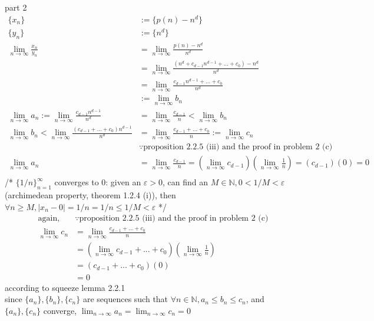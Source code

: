 \documentclass[12pt, border = 4pt, multi]{article} %
\begin{document}
part 2
\begin{align*}
\{x_n\} &:= \{p(n) - n ^ d\}\\
\{y_n\} &:= \{n ^ d\}\\
\lim_{n \rightarrow \infty} \frac{x_n}{y_n} &= \lim_{n \rightarrow \infty} \frac{p(n) - n ^ d}{n ^ d}\\
&= \lim_{n \rightarrow \infty} \frac{(n ^ d + c_{d - 1} n ^ {d - 1} + ... + c_0) - n ^ d}{n ^ d}\\
&= \lim_{n \rightarrow \infty} \frac{c_{d - 1} n ^ {d - 1} + ... + c_0}{n ^ d}\\
&:= \lim_{n \rightarrow \infty} b_n\\
\lim_{n \rightarrow \infty} a_n := \lim_{n \rightarrow \infty} \frac{c_{d - 1} n ^ {d - 1}}{n ^ d} &= \lim_{n \rightarrow \infty} \frac{c_{d - 1}}{n} < \lim_{n \rightarrow \infty} b_n\\
\lim_{n \rightarrow \infty} b_n < \lim_{n \rightarrow \infty} \frac{(c_{d - 1} + ... + c_0)n ^ {d - 1}}{n ^ d} &= \lim_{n \rightarrow \infty} \frac{c_{d - 1} + ... + c_0}{n} := \lim_{n \rightarrow \infty} c_n\\
&\because \text{proposition 2.2.5 (iii) and the proof in problem 2 (c)}\\
\lim_{n \rightarrow \infty} a_n &= \lim_{n \rightarrow \infty}\frac{c_{d - 1}}{n} = \left(\lim_{n \rightarrow \infty}c_{d - 1}\right)\left(\lim_{n \rightarrow \infty}\frac{1}{n}\right) = (c_{d - 1})(0) = 0\\
\end{align*}
/* $\{1 / n\}_{n = 1} ^ {\infty}$ converges to 0: given an $\varepsilon > 0$, can find an $M \in \mathbb{N}, 0 < 1 / M < \varepsilon$ (archimedean property, theorem 1.2.4 (i)), then $\forall n \geq M, |x_n - 0| = 1 / n = 1 / n \leq 1 / M < \varepsilon$ */
\begin{align*}
\text{again, } &\because \text{proposition 2.2.5 (iii) and the proof in problem 2 (c)}\\
\lim_{n \rightarrow \infty} c_n &= \lim_{n \rightarrow \infty} \frac{c_{d - 1} + ... + c_0}{n}\\
&= \left(\lim_{n \rightarrow \infty} c_{d - 1} + ... + c_0\right)\left(\lim_{n \rightarrow \infty}\frac{1}{n}\right)\\
&= (c_{d - 1} + ... + c_0)(0)\\
&= 0
\end{align*}
according to squeeze lemma 2.2.1\\
since $\{a_n\}, \{b_n\}, \{c_n\}$ are sequences such that $\forall n \in \mathbb{N}, a_n \leq b_n \leq c_n$, and $\{a_n\}, \{c_n\}$ converge, $\lim_{n \rightarrow \infty} a_n = \lim_{n \rightarrow \infty} c_n = 0$\\
\end{document}
